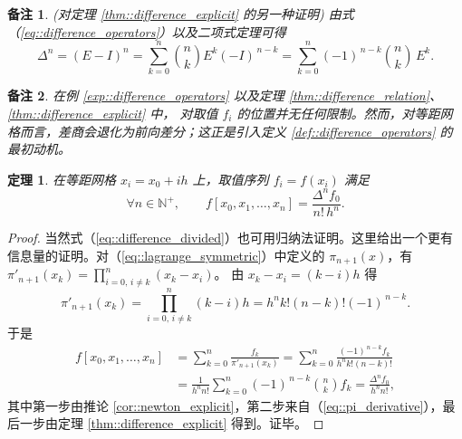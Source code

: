 \documentclass[a4paper]{ctexart}
\newtheorem{theorem}{定理}
\newtheorem{remark}{备注}
\numberwithin{theorem}{section}
\numberwithin{equation}{section}
\numberwithin{figure}{section}
\numberwithin{remark}{section}
\begin{document}
\begin{remark}
    (对定理 \ref{thm::difference_explicit} 的另一种证明)
由式（\ref{eq::difference_operators}）以及二项式定理可得
\begin{equation}
\Delta^{n}=(E-I)^{n}=\sum_{k=0}^{n}\binom{n}{k}E^{k}(-I)^{\,n-k}
=\sum_{k=0}^{n}(-1)^{\,n-k}\binom{n}{k}\,E^{k}.
\end{equation}
\end{remark}

\begin{remark}
在例 \ref{exp::difference_operators} 以及定理 \ref{thm::difference_relation}、\ref{thm::difference_explicit} 中，
对取值 $f_i$ 的位置并无任何限制。然而，对等距网格而言，差商会退化为前向差分；这正是引入定义 \ref{def::difference_operators} 的最初动机。
\end{remark}

\begin{theorem}
    \label{thm::difference_divided}
在等距网格 $x_i=x_0+ih$ 上，取值序列 $f_i=f(x_i)$ 满足
\begin{equation}
    \label{eq::difference_divided}
\forall n\in\mathbb{N}^+,\qquad
f[x_0,x_1,\ldots,x_n]=\frac{\Delta^{n}f_0}{n!\,h^{n}}.
\end{equation}
\end{theorem}
\begin{proof}
当然式（\ref{eq::difference_divided}）也可用归纳法证明。这里给出一个更有信息量的证明。对（\ref{eq::lagrange_symmetric}）中定义的
$\pi_{n+1}(x)$，有
$\pi'_{n+1}(x_k)=\prod_{i=0,\, i\ne k}^{n}(x_k-x_i)$。
由 $x_k-x_i=(k-i)h$ 得
\begin{equation}
    \label{eq::pi_derivative}
\pi'_{n+1}(x_k)=\prod_{i=0,\,i\ne k}^{n}(k-i)h
=h^{n}k!(n-k)!(-1)^{\,n-k}.
\end{equation}
于是
\begin{align*}
f[x_0,x_1,\ldots,x_n]
&=\sum_{k=0}^{n}\frac{f_k}{\pi'_{n+1}(x_k)}
=\sum_{k=0}^{n}\frac{(-1)^{\,n-k}f_k}{h^{n}k!(n-k)!}\\
&=\frac{1}{h^{n}n!}\sum_{k=0}^{n}(-1)^{\,n-k}\binom{n}{k}f_k
=\frac{\Delta^{n}f_0}{h^{n}n!},
\end{align*}
其中第一步由推论 \ref{cor::newton_explicit}，第二步来自（\ref{eq::pi_derivative}），最后一步由定理 \ref{thm::difference_explicit} 得到。证毕。
\end{proof}
\end{document}
